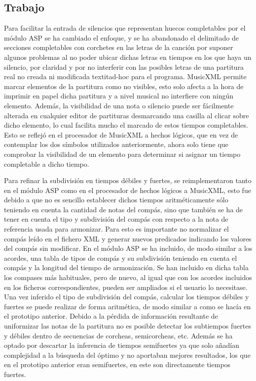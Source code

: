 \subsection{Trabajo}
Para facilitar la entrada de silencios que representan huecos completables por el módulo ASP se ha cambiado el enfoque, y se ha abandonado el delimitado de secciones completables con corchetes en las letras de la canción por suponer algunos problemas al no poder ubicar dichas letras en tiempos en los que haya un silencio, por claridad y por no interferir con las posibles letras de una partitura real no creada ni modificada textit{ad-hoc} para el programa. MusicXML permite marcar elementos de la partitura como no visibles, esto solo afecta a la hora de imprimir en papel dicha partitura y a nivel musical no interfiere con ningún elemento. Además, la visibilidad de una nota o silencio puede ser fácilmente alterada en cualquier editor de partituras desmarcando una casilla al clicar sobre dicho elemento, lo cual facilita mucho el marcado de estos tiempos completables. Esto se reflejó en el procesador de MusicXML a hechos lógicos, que en vez de contemplar los dos símbolos utilizados anteriormente, ahora solo tiene que comprobar la visibilidad de un elemento para determinar si asignar un tiempo completable a dicho tiempo.

Para refinar la subdivisión en tiempos débiles y fuertes, se reimplementaron tanto en el módulo ASP como en el procesador de hechos lógicos a MusicXML, esto fue debido a que no es sencillo establecer dichos tiempos aritméticamente sólo teniendo en cuenta la cantidad de notas del compás, sino que también se ha de tener en cuenta el tipo y subdivisión del compás con respecto a la nota de referencia usada para armonizar. Para esto es importante no normalizar el compás leído en el fichero XML y generar nuevos predicados indicando los valores del compás sin modificar. En el módulo ASP se ha incluido, de modo similar a los acordes, una tabla de tipos de compás y su subdivisión teniendo en cuenta el compás y la longitud del tiempo de armonización. Se han incluido en dicha tabla los compases más habituales, pero de nuevo, al igual que con los acordes incluidos en los ficheros correspondientes, pueden ser ampliados si el usuario lo necesitase. Una vez inferido el tipo de subdivisión del compás, calcular los tiempos débiles y fuertes se puede realizar de forma aritmética, de modo similar a como se hacía en el prototipo anterior. Debido a la pérdida de información resultante de uniformizar las notas de la partitura no es posible detectar los subtiempos fuertes y débiles dentro de secuencias de corcheas, semicorcheas, etc. Además se ha optado por descartar la inferencia de tiempos semifuertes ya que solo añadían complejidad a la búsqueda del óptimo y no aportaban mejores resultados, los que en el prototipo anterior eran semifuertes, en este son directamente tiempos fuertes.


